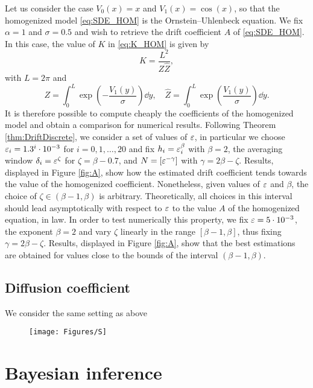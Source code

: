 \documentclass[10pt]{article}
\begin{document}
Let us consider the case $V_0(x) = x$ and $V_1(x) = \cos(x)$, so that the homogenized model \eqref{eq:SDE_HOM} is the Ornstein--Uhlenbeck equation. We fix $\alpha = 1$ and $\sigma = 0.5$ and wish to retrieve the drift coefficient $A$ of \eqref{eq:SDE_HOM}. In this case, the value of $K$ in \eqref{eq:K_HOM} is given by
\begin{equation}
	K = \frac{L^2}{Z\widehat Z},
\end{equation}
with $L = 2\pi$ and 
\begin{equation}
	Z = \int_0^L \exp\left(-\frac{V_1(y)}{\sigma}\right) \dd y, \quad \widehat Z = \int_0^L \exp\left(\frac{V_1(y)}{\sigma}\right) \dd y.
\end{equation}
It is therefore possible to compute cheaply the coefficients of the homogenized model and obtain a comparison for numerical results. Following Theorem \ref{thm:DriftDiscrete}, we consider a set of values of $\varepsilon$, in particular we choose $\varepsilon_i = 1.3^i \cdot 10^{-3}$ for $i = 0, 1, \ldots, 20$ and fix $h_i = \varepsilon_i^\beta$ with $\beta = 2$, the averaging window $\delta_i = \varepsilon^\zeta$ for $\zeta = \beta - 0.7$, and $N = [\varepsilon^{-\gamma}]$ with $\gamma = 2\beta - \zeta$. Results, displayed in Figure \ref{fig:A}, show how the estimated drift coefficient tends towards the value of the homogenized coefficient. Nonetheless, given values of $\varepsilon$ and $\beta$, the choice of $\zeta \in (\beta - 1, \beta)$ is arbitrary. Theoretically, all choices in this interval should lead asymptotically with respect to $\varepsilon$ to the value $A$ of the homogenized equation, in law. In order to test numerically this property, we fix $\varepsilon = 5\cdot 10^{-3}$, the exponent $\beta = 2$ and vary $\zeta$ linearly in the range $[\beta - 1, \beta]$, thus fixing $\gamma = 2\beta - \zeta$. Results, displayed in Figure \ref{fig:A}, show that the best estimations are obtained for values close to the bounds of the interval $(\beta-1, \beta)$.

\subsection{Diffusion coefficient}

We consider the same setting as above

\begin{figure}
	\centering
	\texttt{[image: Figures/S]}
\end{figure}

\section{Bayesian inference}
\end{document}
